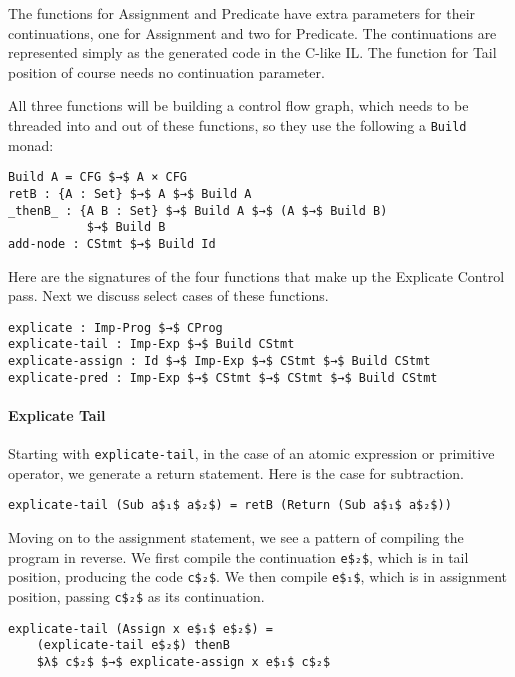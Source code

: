 \documentclass[sigplan,review,dvipsnames,screen,10pt]{acmart}
\begin{document}
The functions for Assignment and Predicate have extra parameters for
their continuations, one for Assignment and two for Predicate. The
continuations are represented simply as the generated code in the
C-like IL. The function for Tail position of course needs no
continuation parameter.

All three functions will be building a control flow graph, which needs
to be threaded into and out of these functions, so they use the
following a \lstinline{Build} monad:

\begin{lstlisting}
Build A = CFG $→$ A × CFG
retB : {A : Set} $→$ A $→$ Build A
_thenB_ : {A B : Set} $→$ Build A $→$ (A $→$ Build B)
           $→$ Build B
add-node : CStmt $→$ Build Id
\end{lstlisting}

\noindent Here are the signatures of the four functions that make up
the Explicate Control pass. Next we discuss select cases of these
functions.

\begin{lstlisting}
explicate : Imp-Prog $→$ CProg
explicate-tail : Imp-Exp $→$ Build CStmt
explicate-assign : Id $→$ Imp-Exp $→$ CStmt $→$ Build CStmt
explicate-pred : Imp-Exp $→$ CStmt $→$ CStmt $→$ Build CStmt
\end{lstlisting}

\paragraph{Explicate Tail}

Starting with \lstinline{explicate-tail}, in the case of an atomic
expression or primitive operator, we generate a return statement.
Here is the case for subtraction.

\begin{lstlisting}
explicate-tail (Sub a$₁$ a$₂$) = retB (Return (Sub a$₁$ a$₂$))
\end{lstlisting}

\noindent Moving on to the assignment statement, we see a pattern of
compiling the program in reverse. We first compile the continuation
\lstinline{e$₂$}, which is in tail position, producing the code \lstinline{c$₂$}.
We then compile \lstinline{e$₁$}, which is in assignment position,
passing \lstinline{c$₂$} as its continuation.

\begin{lstlisting}
explicate-tail (Assign x e$₁$ e$₂$) =
    (explicate-tail e$₂$) thenB
    $λ$ c$₂$ $→$ explicate-assign x e$₁$ c$₂$
\end{lstlisting}
\end{document}
